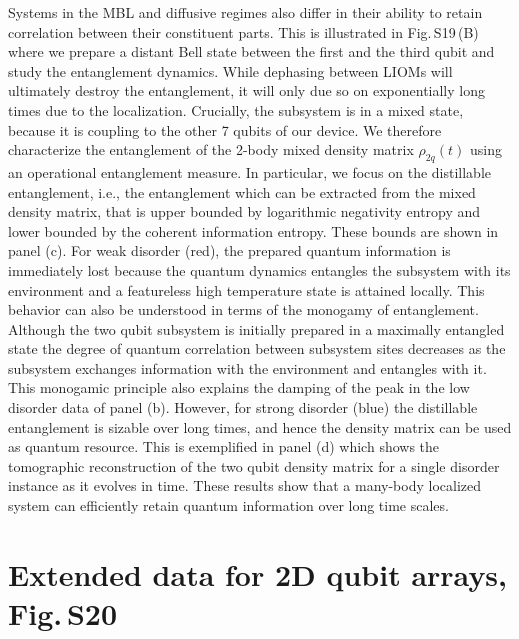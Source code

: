 Systems in the MBL and diffusive regimes also differ in their ability to retain correlation between their constituent parts.  This is illustrated in Fig.\,S19\,(B) where we prepare a distant Bell state between the first and the third qubit and study the entanglement dynamics.
While dephasing between LIOMs will ultimately destroy the entanglement, it will only due so on exponentially long times due to the localization.
Crucially, the subsystem is in a mixed state, because it is coupling to the other 7 qubits of our device.
We therefore characterize the entanglement of the 2-body mixed density matrix $\rho_{2q} \left( t \right)$ using an operational entanglement measure.
In particular, we focus on the distillable entanglement, i.e., the entanglement which can be extracted from the mixed density matrix, that is upper bounded by logarithmic negativity entropy and lower bounded by the coherent information entropy.
These bounds are shown in panel (c). For weak disorder (red), the prepared quantum information is immediately lost because the quantum dynamics entangles the subsystem with its environment and a featureless high temperature state is attained locally.
%
This behavior can also be understood in terms of the monogamy of entanglement.\autocite{Wootters2000}
Although the two qubit subsystem is initially prepared in a maximally entangled state the degree of quantum correlation between subsystem sites decreases as the subsystem exchanges information with the environment and entangles with it.
This monogamic principle also explains the damping of the peak in the low disorder data of panel (b).
%
However, for strong disorder (blue) the distillable entanglement is sizable over long times, and hence the density matrix can be used as quantum resource.
This is exemplified in panel (d) which shows the tomographic reconstruction of the two qubit density matrix for a single disorder instance as it evolves in time.
These results show that a many-body localized system can efficiently retain quantum information over long time scales.

\section{Extended data for 2D qubit arrays, Fig.\,S20}
